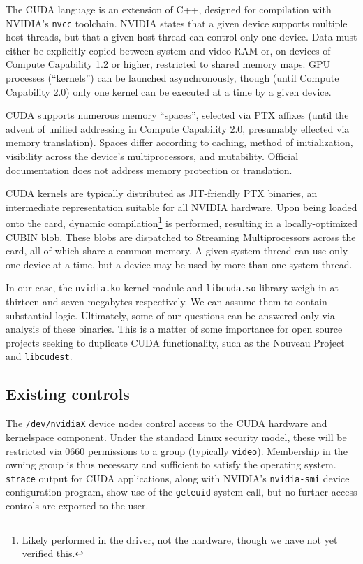 \documentclass[letterpaper,10pt]{article}
\begin{document}
\begin{multicols}{2}
The CUDA language is an extension of C++, designed for compilation with NVIDIA's \texttt{nvcc}\cite{nvcc}
toolchain. NVIDIA states that a given device supports multiple host threads,
but that a given host thread can control only one device. Data must either be
explicitly copied between system and video RAM or, on devices of Compute Capability
1.2 or higher, restricted to shared memory maps\cite{cudaguide}. GPU processes
(``kernels'') can be launched asynchronously, though (until Compute Capability
2.0) only one kernel can be executed at a time by a given device.

CUDA supports numerous memory ``spaces'', selected via PTX affixes (until the
advent of unified addressing in Compute Capability 2.0, presumably effected via
memory translation). Spaces differ according to caching, method of
initialization, visibility across the device's multiprocessors, and mutability.
Official documentation does not address memory protection or translation.

CUDA kernels are typically distributed as JIT-friendly PTX binaries\cite{kerr},
an intermediate representation suitable for all NVIDIA hardware. Upon being
loaded onto the card, dynamic compilation\footnote{Likely performed in the
driver, not the hardware, though we have not yet verified this.} is performed,
resulting in a locally-optimized CUBIN blob. These blobs are dispatched to
Streaming Multiprocessors across the card, all of which share a common memory.
A given system thread can use only one device at a time, but a device may be
used by more than one system thread.

In our case, the \texttt{nvidia.ko} kernel module and \texttt{libcuda.so}
library weigh in at thirteen and seven megabytes respectively. We can assume
them to contain substantial logic. Ultimately, some of our questions can be
answered only via analysis of these binaries. This is a matter of some importance
for open source projects seeking to duplicate CUDA functionality, such as the
Nouveau Project and \texttt{libcudest}\cite{libcudest}.

\subsection{Existing controls}
The \texttt{/dev/nvidiaX} device nodes control access to the CUDA hardware and
kernelspace component. Under the standard Linux security model, these
will be restricted via 0660 permissions to a group (typically \texttt{video}).
Membership in the owning group is thus necessary and sufficient to satisfy the
operating system. \texttt{strace} output for CUDA applications, along with
NVIDIA's \texttt{nvidia-smi} device configuration program, show use of the
\texttt{geteuid} system call, but no further access controls are exported to
the user.


\end{multicols}
\end{document}
